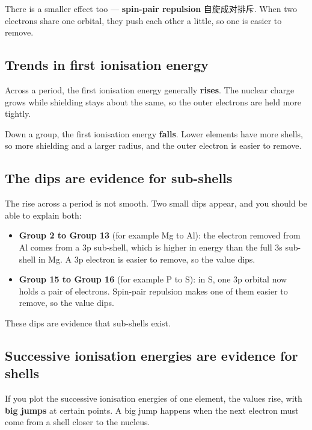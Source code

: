 \documentclass[11pt]{article}
\begin{document}
There is a smaller effect too — \textbf{spin-pair repulsion} 自旋成对排斥. When two electrons share one orbital, they push each other a little, so one is easier to remove.

\subsection*{Trends in first ionisation energy}

Across a period, the first ionisation energy generally \textbf{rises}. The nuclear charge grows while shielding stays about the same, so the outer electrons are held more tightly.

Down a group, the first ionisation energy \textbf{falls}. Lower elements have more shells, so more shielding and a larger radius, and the outer electron is easier to remove.

\subsection*{The dips are evidence for sub-shells}

The rise across a period is not smooth. Two small dips appear, and you should be able to explain both:

\begin{itemize}
\item \textbf{Group 2 to Group 13} (for example Mg to Al): the electron removed from Al comes from a 3p sub-shell, which is higher in energy than the full 3s sub-shell in Mg. A 3p electron is easier to remove, so the value dips.

\item \textbf{Group 15 to Group 16} (for example P to S): in S, one 3p orbital now holds a pair of electrons. Spin-pair repulsion makes one of them easier to remove, so the value dips.

\end{itemize}

These dips are evidence that sub-shells exist.

\subsection*{Successive ionisation energies are evidence for shells}

If you plot the successive ionisation energies of one element, the values rise, with \textbf{big jumps} at certain points. A big jump happens when the next electron must come from a shell closer to the nucleus.
\end{document}
